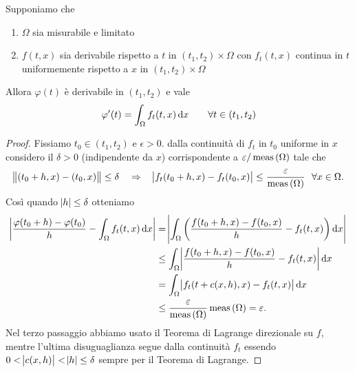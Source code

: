 \begin{thm} \label{thm:scabioderivataintegrale}
	Supponiamo che 
	\begin{enumerate}[label = (\roman*)]
		\item $ \Omega $ sia misurabile e limitato
		\item $ f(t, x) $ sia derivabile rispetto a $ t $ in $ (t_1, t_2) \times \Omega $ con $ f_t(t, x) $ continua in $ t $ uniformemente rispetto a $ x $ in $ (t_1, t_2) \times \Omega $
	\end{enumerate}
	Allora $ \varphi(t) $ è derivabile in $ (t_1, t_2) $ e vale
	\begin{equation}
		\varphi'(t) = \int_{\Omega} f_t(t, x) \dif{x} \qquad \forall t \in (t_1, t_2)
	\end{equation}
\end{thm}
%
\begin{proof}
	Fissiamo $ t_0 \in (t_1, t_2) $ e $ \epsilon > 0 $. dalla continuità di $ f_t $ in $ t_0 $ uniforme in $ x $ considero il $ \delta > 0 $ (indipendente da $ x $) corrispondente a $ \varepsilon / \operatorname{meas}{(\Omega)} $ tale che
	\[
		\norm{(t_0 + h, x) - (t_0, x)} \leq \delta \quad \Rightarrow \quad  \abs{f_t(t_0 + h, x) - f_t(t_0, x)} \leq \frac{\varepsilon}{\operatorname{meas}{(\Omega)}} \ \ \forall x \in \Omega.
	\]
	Così quando $ \abs{h} \leq \delta $ otteniamo
	\begin{align*}
		\abs{\frac{\varphi(t_0 + h) - \varphi(t_0)}{h} - \int_{\Omega} f_t(t, x) \dif{x}} & = \abs{\int_{\Omega} \left(\frac{f(t_0 + h, x) - f(t_0, x)}{h} - f_t(t, x)\right) \dif{x}} \\
		& \leq \int_{\Omega} \abs{\frac{f(t_0 + h, x) - f(t_0, x)}{h} - f_t(t, x)} \dif{x} \\
		& = \int_{\Omega} \abs{f_t(t + c(x, h), x) - f_t(t, x)} \dif{x} \\
		& \leq \frac{\epsilon}{\meas{(\Omega)}} \meas{(\Omega)} = \epsilon.
	\end{align*}
	Nel terzo passaggio abbiamo usato il Teorema di Lagrange direzionale su $ f $, mentre l'ultima disuguaglianza segue dalla continuità $ f_t $ essendo $ 0 < \abs{c(x, h)} < \abs{h} \leq \delta $ sempre per il Teorema di Lagrange. 
\end{proof}


